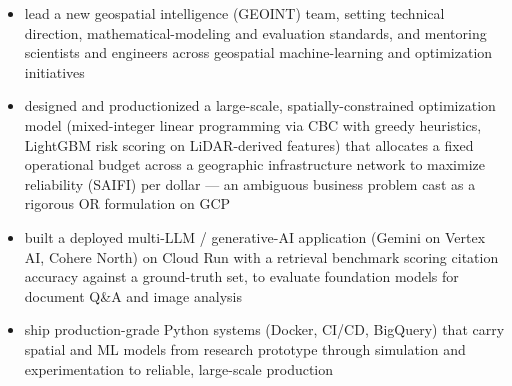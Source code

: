 \documentclass[10pt,a4paper,withhyper]{altacv}
\renewcommand{\divider}{%
  \vspace{-0.15\baselineskip}%
  \textcolor{body!25}{\hdashrule{\linewidth}{0.4pt}{0.8ex}}%
  \vspace{2pt}%
}
\begin{document}

\begin{fullwidth}
\makecvheader
\end{fullwidth}




\begin{itemize}
  \item lead a new geospatial intelligence (GEOINT) team, setting technical direction, mathematical-modeling and evaluation standards, and mentoring scientists and engineers across geospatial machine-learning and optimization initiatives
  \item designed and productionized a large-scale, spatially-constrained optimization model (mixed-integer linear programming via CBC with greedy heuristics, LightGBM risk scoring on LiDAR-derived features) that allocates a fixed operational budget across a geographic infrastructure network to maximize reliability (SAIFI) per dollar --- an ambiguous business problem cast as a rigorous OR formulation on GCP
  \item built a deployed multi-LLM / generative-AI application (Gemini on Vertex AI, Cohere North) on Cloud Run with a retrieval benchmark scoring citation accuracy against a ground-truth set, to evaluate foundation models for document Q\&A and image analysis
  \item ship production-grade Python systems (Docker, CI/CD, BigQuery) that carry spatial and ML models from research prototype through simulation and experimentation to reliable, large-scale production
\end{itemize}

\divider
\end{document}
